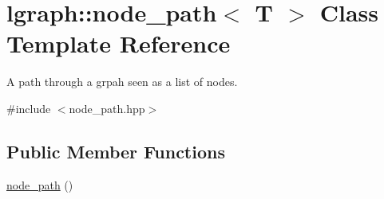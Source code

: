 \hypertarget{classlgraph_1_1node__path}{\section{lgraph\-:\-:node\-\_\-path$<$ T $>$ Class Template Reference}
\label{classlgraph_1_1node__path}
}


A path through a grpah seen as a list of nodes.  




{\ttfamily \#include $<$node\-\_\-path.\-hpp$>$}

\subsection*{Public Member Functions}
\begin{DoxyCompactItemize}
\item 
\hypertarget{classlgraph_1_1node__path_a91814e22e41ebfd16223fff389819ae9}{\hyperlink{classlgraph_1_1node__path_a91814e22e41ebfd16223fff389819ae9}{node\-\_\-path} ()}\label{classlgraph_1_1node__path_a91814e22e41ebfd16223fff389819ae9}


\end{DoxyCompactItemize}
